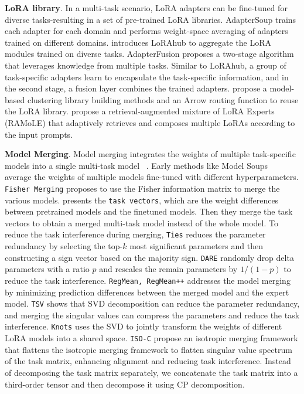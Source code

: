 \documentclass[10pt]{article} %
\begin{document}
    \noindent
    \textbf{LoRA library}.  In a multi-task scenario, LoRA adapters can be fine-tuned for diverse tasks-resulting in a set of pre-trained LoRA libraries. 
    AdapterSoup \citet{chronopoulou2023adaptersoup} trains
    each adapter for each domain and performs weight-space averaging of adapters
    trained on different domains. \cite{huang2023lorahub} introduces LoRAhub to
    aggregate the LoRA modules trained on diverse tasks. AdapterFusion \citep{pfeiffer2021adapterfusion}
    proposes a two-stage algorithm that leverages knowledge from multiple tasks.
    Similar to LoRAhub, a group of task-specific adapters learn to encapsulate
    the task-specific information, and in the second stage, a fusion layer
    combines the trained adapters. \citet{ostapenko2024towards} propose a model-based
    clustering library building methods and an Arrow routing function to reuse
    the LoRA library. \citet{zhao2024retrieval} propose a retrieval-augmented
    mixture of LoRA Experts (RAMoLE) that adaptively retrieves and composes
    multiple LoRAs according to the input prompts. 

    \noindent
    \textbf{Model Merging}. Model merging integrates the weights of multiple
    task-specific models into a single multi-task model ~\citep{davari2024model,ilharco2022editing,matena2022merging,wortsman2022model,yadav2023ties,yu2024language,lu2024twin,yang2026model,deep2024della,miyano2025adaptive,chen2025black}. Early methods like Model Soups~\cite{wortsman2022model,choi2024revisiting} average the weights of multiple models fine-tuned with different hyperparameters. \citet{matena2022merging} \texttt{Fisher Merging} proposes to use the Fisher information matrix to merge the various models. \citet{ilharco2022editing} presents the \texttt{task vectors}, which are the weight
    differences between pretrained models and the finetuned models. Then they merge 
    the task vectors to obtain a merged multi-task model instead of the whole model.  To reduce the task interference during merging, \texttt{Ties}
    \cite{yadav2023ties} reduces the parameter redundancy by selecting the top-$k$
    most significant parameters and then constructing a sign vector based on the
    majority sign. \texttt{DARE} \cite{yu2024language} randomly drop delta parameters with a ratio $p$ and rescales the remain parameters by $1/(1-p)$ to reduce the task interference.  \texttt{RegMean, RegMean++} \cite{reg_mean,nguyen2025regmean++} addresses the model merging by minimizing prediction differences between the merged model and the expert model. \texttt{TSV} \cite{gargiulo2025task} shows
    that SVD decomposition can reduce the parameter redundancy, and merging the singular
    values can compress the parameters and reduce the task interference. \texttt{Knots}
    \citet{stoica2025model} uses the SVD to jointly transform the weights of
    different LoRA models into a shared space. \texttt{ISO-C}
    \cite{marczak2025no} propose an isotropic merging framework that flattens
    the isotropic merging framework to flatten singular value spectrum of the
    task matrix, enhancing alignment and reducing task interference. Instead of
    decomposing the task matrix separately, we concatenate the task matrix into a
    third-order tensor and then decompose it using CP decomposition.
\end{document}
